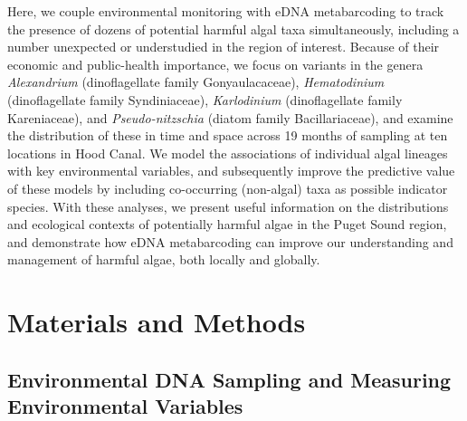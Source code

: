 \documentclass[
]{article}
\begin{document}
Here, we couple environmental monitoring with eDNA metabarcoding to
track the presence of dozens of potential harmful algal taxa
simultaneously, including a number unexpected or understudied in the
region of interest. Because of their economic and public-health
importance, we focus on variants in the genera \emph{Alexandrium}
(dinoflagellate family Gonyaulacaceae), \emph{Hematodinium}
(dinoflagellate family Syndiniaceae), \emph{Karlodinium} (dinoflagellate
family Kareniaceae), and \emph{Pseudo-nitzschia} (diatom family
Bacillariaceae), and examine the distribution of these in time and space
across 19 months of sampling at ten locations in Hood Canal. We model
the associations of individual algal lineages with key environmental
variables, and subsequently improve the predictive value of these models
by including co-occurring (non-algal) taxa as possible indicator
species. With these analyses, we present useful information on the
distributions and ecological contexts of potentially harmful algae in
the Puget Sound region, and demonstrate how eDNA metabarcoding can
improve our understanding and management of harmful algae, both locally
and globally.

\hypertarget{materials-and-methods}{%
\section{Materials and Methods}\label{materials-and-methods}}

\hypertarget{environmental-dna-sampling-and-measuring-environmental-variables}{%
\subsection{Environmental DNA Sampling and Measuring Environmental
Variables}\label{environmental-dna-sampling-and-measuring-environmental-variables}}
\end{document}
